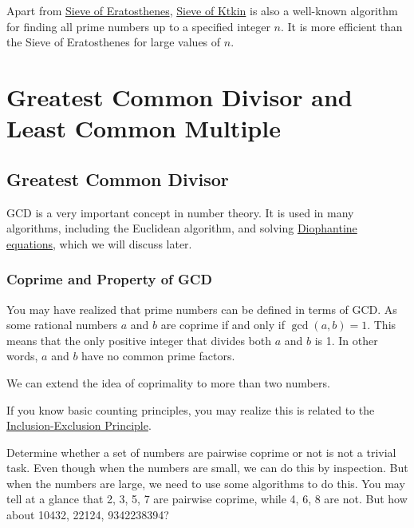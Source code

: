 \documentclass[oneside]{book}
\begin{document}
Apart from \href{https://en.wikipedia.org/wiki/Sieve_of_Eratosthenes}{Sieve of Eratosthenes}, \href{https://en.wikipedia.org/wiki/Sieve_of_Atkin}{Sieve of Ktkin} is also a well-known algorithm for finding all prime numbers up to a specified integer \( n \). It is more efficient than the Sieve of Eratosthenes for large values of \( n \).

\section{Greatest Common Divisor and Least Common Multiple}
\subsection{Greatest Common Divisor}

GCD is a very important concept in number theory. It is used in many algorithms, including the Euclidean algorithm, and solving \href{https://en.wikipedia.org/wiki/Diophantine_equation}{Diophantine equations}, which we will discuss later.

\subsubsection{Coprime and Property of GCD}
You may have realized that prime numbers can be defined in terms of GCD. As some rational numbers $a$ and $b$ are coprime if and only if $\gcd(a, b) = 1$. This means that the only positive integer that divides both $a$ and $b$ is 1. In other words, $a$ and $b$ have no common prime factors.

We can extend the idea of coprimality to more than two numbers.


If you know basic counting principles, you may realize this is related to the
\href{https://en.wikipedia.org/wiki/Inclusion%E2%80%93exclusion_principle}{Inclusion-Exclusion Principle}.

Determine whether a set of numbers are pairwise coprime or not is not a trivial task. Even though when the numbers are small, we can do this by inspection. But when the numbers are large, we need to use some algorithms to do this. You may tell at a glance that 2, 3, 5, 7 are pairwise coprime, while 4, 6, 8 are not. But how about 10432, 22124, 9342238394?
\end{document}
